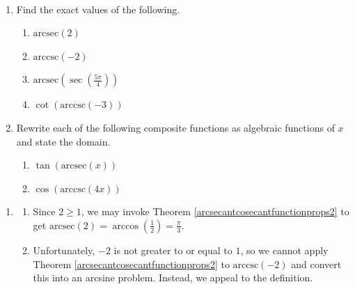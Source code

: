 \documentclass{ximera}
\begin{document}
\begin{example}  \label{arcsecantcosecantex2} $~$

\begin{enumerate}

\item  Find the exact values of the following.

\begin{enumerate}

\item $\text{arcsec}(2)$

\item  $\text{arccsc}(-2)$

\item  $\text{arcsec}\left( \sec\left( \frac{5\pi}{4} \right) \right)$

\item  $\cot\left(\text{arccsc}\left(-3\right)\right)$

\end{enumerate}

\item  Rewrite each of the following composite functions as algebraic functions of $x$ and state the domain.


\begin{enumerate}

\item \label{tangentofarcsecantexample2} $\tan(\text{arcsec}(x))$

\item  $\cos(\text{arccsc}(4x))$ 

\end{enumerate}


\end{enumerate}

\begin{explanation}

\begin{enumerate}
\item
\begin{enumerate}

\item  Since $2 \geq 1$, we may invoke Theorem \ref{arcsecantcosecantfunctionprops2} to get $\text{arcsec}(2) = \arccos\left(\frac{1}{2}\right) = \frac{\pi}{3}$.

\item  Unfortunately, $-2$ is not greater to or equal to $1$, so we cannot apply Theorem \ref{arcsecantcosecantfunctionprops2} to  $\text{arccsc}(-2)$ and convert this into an arcsine problem.  Instead, we appeal to the definition.  


\end{enumerate}
\end{enumerate}
\end{explanation}
\end{example}
\end{document}

